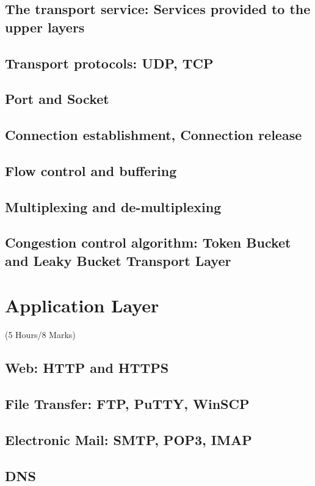 \documentclass[12pt]{article}
\begin{document}
	\subsection{The transport service: Services provided to the upper layers}
	\subsection{Transport protocols: UDP, TCP}
	\subsection{Port and Socket}
	\subsection{Connection establishment, Connection release}
	\subsection{Flow control and buffering}
	\subsection{Multiplexing and de-multiplexing}
	\subsection{Congestion control algorithm: Token Bucket and Leaky Bucket Transport Layer}

	\pagebreak

\section{Application Layer}
	\begin{center}(5 Hours/8 Marks)\end{center}
	\subsection{Web: HTTP and HTTPS}
	\subsection{File Transfer: FTP, PuTTY, WinSCP}
	\subsection{Electronic Mail: SMTP, POP3, IMAP}
	\subsection{DNS}
\end{document}
